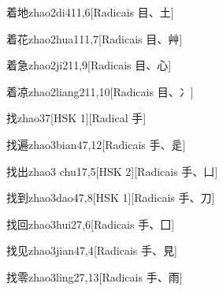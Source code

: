 \begin{entry}{着地}{zhao2di4}{11,6}[Radicais ⽬、⼟]
\end{entry}

\begin{entry}{着花}{zhao2hua1}{11,7}[Radicais ⽬、⾋]
\end{entry}

\begin{entry}{着急}{zhao2ji2}{11,9}[Radicais ⽬、⼼]
\end{entry}

\begin{entry}{着凉}{zhao2liang2}{11,10}[Radicais ⽬、⼎]
\end{entry}

\begin{entry}{找}{zhao3}{7}[HSK 1][Radical ⼿]
\end{entry}

\begin{entry}{找遍}{zhao3bian4}{7,12}[Radicais ⼿、⾡]
\end{entry}

\begin{entry}{找出}{zhao3 chu1}{7,5}[HSK 2][Radicais ⼿、⼐]
\end{entry}

\begin{entry}{找到}{zhao3dao4}{7,8}[HSK 1][Radicais ⼿、⼑]
\end{entry}

\begin{entry}{找回}{zhao3hui2}{7,6}[Radicais ⼿、⼞]
\end{entry}

\begin{entry}{找见}{zhao3jian4}{7,4}[Radicais ⼿、⾒]
\end{entry}

\begin{entry}{找零}{zhao3ling2}{7,13}[Radicais ⼿、⾬]
\end{entry}

